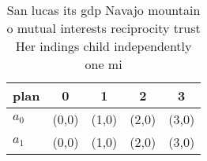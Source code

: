 \documentclass[a4paper]{article}
\begin{document}
\begin{table}
\begin{adjustbox}{width=0.6\columnwidth}
\begin{tabular}{|l|l|l|l|l|}
\hline
\textbf{plan} & \multicolumn{1}{c|}{\textbf{0}} & \multicolumn{1}{c|}{\textbf{1}} & \multicolumn{1}{c|}{\textbf{2}} & \multicolumn{1}{c|}{\textbf{3}} \\ \hline
\textbf{$a_0$}  & (0,0) & (1,0) & (2,0) & (3,0) \\ \hline
\textbf{$a_1$}  & (0,0) & (1,0) & (2,0) & (3,0) \\ \hline
\end{tabular}
\end{adjustbox}
\caption{San lucas its gdp Navajo mountain o mutual interests reciprocity trust Her indings child independently one mi
}
\end{table}
\end{document}
